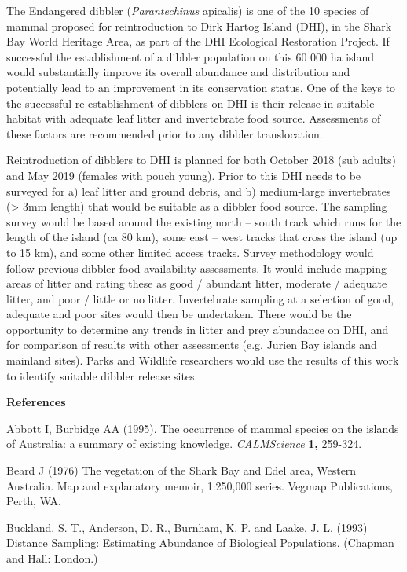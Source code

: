 \documentclass[version=last,
    paper=a4,                               %
    10pt,                                   %
    dvipsnames,
    oneside,                              %
    headings=openany,                       %
    open=any,
    BCOR=7mm,                               %
    DIV=15,     %
]{scrbook}
\begin{document}
The Endangered dibbler (\emph{Parantechinus} apicalis) is one of the 10
species of mammal proposed for reintroduction to Dirk Hartog Island
(DHI), in the Shark Bay World Heritage Area, as part of the DHI
Ecological Restoration Project. If successful the establishment of a
dibbler population on this 60 000 ha island would substantially improve
its overall abundance and distribution and potentially lead to an
improvement in its conservation status. One of the keys to the
successful re-establishment of dibblers on DHI is their release in
suitable habitat with adequate leaf litter and invertebrate food source.
Assessments of these factors are recommended prior to any dibbler
translocation.

Reintroduction of dibblers to DHI is planned for both October 2018 (sub
adults) and May 2019 (females with pouch young). Prior to this DHI needs
to be surveyed for a) leaf litter and ground debris, and b) medium-large
invertebrates (\textgreater{} 3mm length) that would be suitable as a
dibbler food source. The sampling survey would be based around the
existing north -- south track which runs for the length of the island
(ca 80 km), some east -- west tracks that cross the island (up to 15
km), and some other limited access tracks. Survey methodology would
follow previous dibbler food availability assessments. It would include
mapping areas of litter and rating these as good / abundant litter,
moderate / adequate litter, and poor / little or no litter. Invertebrate
sampling at a selection of good, adequate and poor sites would then be
undertaken. There would be the opportunity to determine any trends in
litter and prey abundance on DHI, and for comparison of results with
other assessments (e.g. Jurien Bay islands and mainland sites). Parks
and Wildlife researchers would use the results of this work to identify
suitable dibbler release sites.

\textbf{References}

Abbott I, Burbidge AA (1995). The occurrence of mammal species on the
islands of Australia: a summary of existing knowledge.
\emph{CALMScience} \textbf{1,} 259-324.

Beard J (1976) The vegetation of the Shark Bay and Edel area, Western
Australia. Map and explanatory memoir, 1:250,000 series. Vegmap
Publications, Perth, WA.

Buckland, S. T., Anderson, D. R., Burnham, K. P. and Laake, J. L. (1993)
Distance Sampling: Estimating Abundance of Biological Populations.
(Chapman and Hall: London.)
\end{document}
